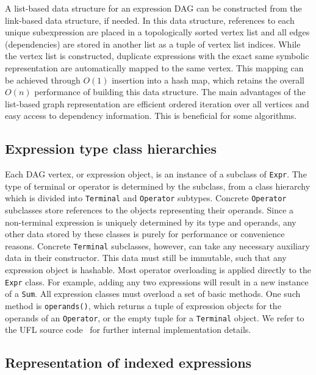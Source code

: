 \documentclass[prodmode,acmtoms]{acmsmall}
\newcommand{\uflc}[1]{\texttt{#1}}
\begin{document}
A list-based data structure for an expression DAG can be constructed
from the link-based data structure, if needed. In this data structure,
references to each unique subexpression are placed in a topologically
sorted vertex list and all edges (dependencies) are stored in another
list as a tuple of vertex list indices. While the vertex list is
constructed, duplicate expressions with the exact same symbolic
representation are automatically mapped to the same vertex.  This
mapping can be achieved through $O(1)$ insertion into a hash map,
which retains the overall $O(n)$ performance of building this data
structure. The main advantages of the list-based graph representation
are efficient ordered iteration over all vertices and easy access to
dependency information. This is beneficial for some algorithms.

\subsection{Expression type class hierarchies}

Each DAG vertex, or expression object, is an instance of a subclass of
\uflc{Expr}. The type of terminal or operator is determined by the
subclass, from a class hierarchy which is divided into
\uflc{Terminal} and \uflc{Operator} subtypes. Concrete
\uflc{Operator} subclasses store references to the objects
representing their operands. Since a non-terminal expression is
uniquely determined by its type and operands, any other data stored by
these classes is purely for performance or convenience reasons.
Concrete \uflc{Terminal} subclasses, however, can take any necessary
auxiliary data in their constructor. This data must still be
immutable, such that any expression object is hashable. Most operator
overloading is applied directly to the \uflc{Expr} class. For
example, adding any two expressions will result in a new instance of a
\uflc{Sum}. All expression classes must overload a set of basic
methods. One such method is \uflc{operands()}, which returns a tuple
of expression objects for the operands of an \uflc{Operator}, or the
empty tuple for a \uflc{Terminal} object. We refer to the UFL source
code~\citep{ufl:www} for further internal implementation details.

\subsection{Representation of indexed expressions}
\end{document}
